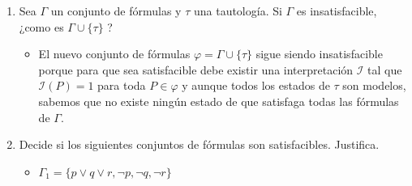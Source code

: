 \documentclass[11pt,letterpaper]{article}
\begin{document}
\begin{enumerate}
    \item Sea $\Gamma$ un conjunto de fórmulas y $\tau$ una tautología.
    Si $\Gamma$ es insatisfacible, ¿como es $\Gamma \cup \{\tau\}$ ?

        \begin{itemize}
            \item El nuevo conjunto de fórmulas $\varphi = \Gamma \cup \{\tau\}$
            sigue siendo insatisfacible porque para que sea satisfacible debe
            existir una interpretación $\mathcal{I}$ tal que $\mathcal{I}(P) = 1$
            para toda $P \in \varphi$ y aunque todos los estados de $\tau$ son modelos,
            sabemos que no existe ningún estado de que satisfaga todas las fórmulas de
            $\Gamma$.
        \end{itemize}

    \item Decide si los siguientes conjuntos de fórmulas son satisfacibles. Justifica.

        \begin{itemize}
            \item $\Gamma_1 = \{p \lor q \lor r, \neg p, \neg q, \neg r\}$


\end{itemize}
\end{enumerate}
\end{document}
